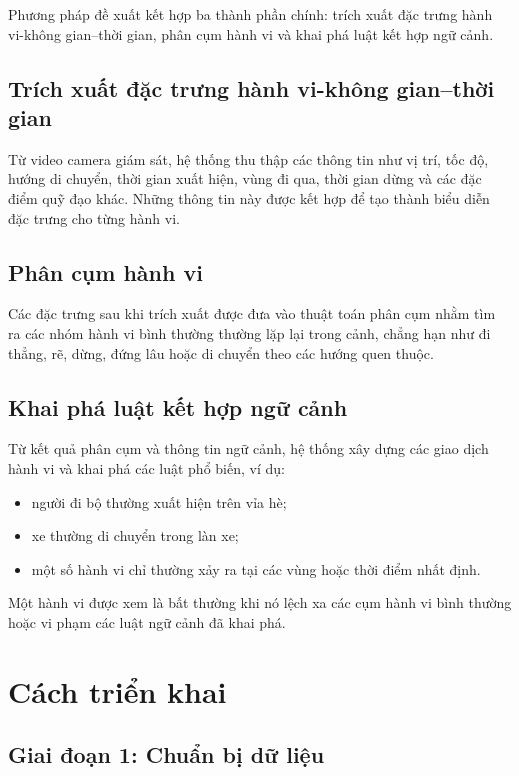 Phương pháp đề xuất kết hợp ba thành phần chính: trích xuất đặc trưng hành vi-không gian--thời gian, phân cụm hành vi và khai phá luật kết hợp ngữ cảnh.

\subsection{Trích xuất đặc trưng hành vi-không gian--thời gian}

Từ video camera giám sát, hệ thống thu thập các thông tin như vị trí, tốc độ, hướng di chuyển, thời gian xuất hiện, vùng đi qua, thời gian dừng và các đặc điểm quỹ đạo khác. Những thông tin này được kết hợp để tạo thành biểu diễn đặc trưng cho từng hành vi.

\subsection{Phân cụm hành vi}

Các đặc trưng sau khi trích xuất được đưa vào thuật toán phân cụm nhằm tìm ra các nhóm hành vi bình thường thường lặp lại trong cảnh, chẳng hạn như đi thẳng, rẽ, dừng, đứng lâu hoặc di chuyển theo các hướng quen thuộc.

\subsection{Khai phá luật kết hợp ngữ cảnh}

Từ kết quả phân cụm và thông tin ngữ cảnh, hệ thống xây dựng các giao dịch hành vi và khai phá các luật phổ biến, ví dụ:

\begin{itemize}
    \item người đi bộ thường xuất hiện trên vỉa hè;
    \item xe thường di chuyển trong làn xe;
    \item một số hành vi chỉ thường xảy ra tại các vùng hoặc thời điểm nhất định.
\end{itemize}

Một hành vi được xem là bất thường khi nó lệch xa các cụm hành vi bình thường hoặc vi phạm các luật ngữ cảnh đã khai phá.

\section{Cách triển khai}

\subsection{Giai đoạn 1: Chuẩn bị dữ liệu}

